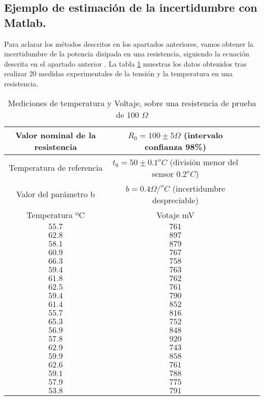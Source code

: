 \subsection{Ejemplo de estimación de la incertidumbre con Matlab.}

Para aclarar los métodos descritos en los apartados anteriores, vamos obtener la incertidumbre de la potencia disipada en una resistencia, siguiendo la ecuación descrita en el apartado anterior . La tabla \ref{tabres} muestras los datos obtenidos tras realizar 20 medidas experimentales de la tensión y la temperatura en una resistencia.

\begin{table}[h]
\caption{Mediciones de temperatura y Voltaje, sobre una resistencia de prueba de 100 $\Omega$}
\label{tabres}
\centering
\begin{tabular}{cccc}
\hline
Valor nominal de la resistencia& $R_0=100 \pm 5 \Omega$ (intervalo confianza 98\%) \\ 
\hline
Temperatura de referencia& $t_0=50\pm 0.1 ^oC$ (división menor del sensor $0.2^oC$) \\
\hline
Valor del parámetro b& $b = 0.4\Omega / ^oC$ (incertidumbre despreciable)\\
\hline
\hline
Temperatura ºC& Votaje mV\\
\hline
 $55.7$&$761$\\
\hline 
 $62.8$&$897$\\
\hline 
 $58.1$&$879$\\
\hline 
 $60.9$&$767$\\
\hline 
 $66.3$&$758$\\
\hline 
 $59.4$&$763$\\
\hline 
 $61.8$&$762$\\
\hline 
 $62.5$&$761$\\
\hline 
 $59.4$&$790$\\
\hline 
 $61.4$&$852$\\
\hline 
 $55.7$&$816$\\
\hline 
 $65.3$&$752$\\
\hline 
 $56.9$&$848$\\
\hline 
 $57.8$&$920$\\
\hline 
 $62.9$&$743$\\
\hline 
 $59.9$&$858$\\
\hline 
 $62.6$&$761$\\
\hline 
 $59.1$&$788$\\
\hline 
 $57.9$&$775$\\
\hline
 $53.8$&$791$\\
\hline
\hline
\end{tabular}
\end{table}

